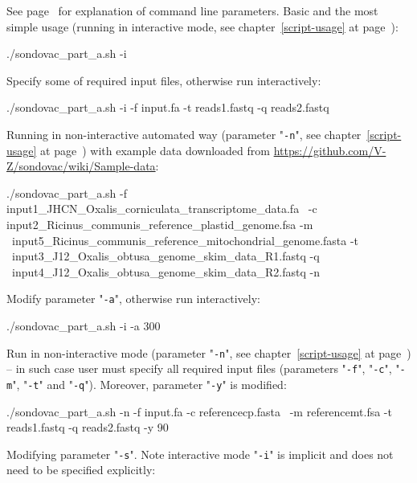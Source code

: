 \documentclass[a4paper, 11pt, twoside]{article}
\begin{document}
See page~\pageref{script-usage} for explanation of command line parameters. Basic and the most simple usage (running in interactive mode, see chapter~\ref{script-usage} at page~\pageref{script-usage}):

\begin{bashcode}
  ./sondovac_part_a.sh -i
\end{bashcode}

Specify some of required input files, otherwise run interactively:

\begin{bashcode}
  ./sondovac_part_a.sh -i -f input.fa -t reads1.fastq -q reads2.fastq
\end{bashcode}

Running in non-interactive automated way (parameter "\texttt{-n}", see chapter~\ref{script-usage} at page~\pageref{script-usage}) with 
example data downloaded from \href{https://github.com/V-Z/sondovac/wiki/Sample-data}{https://github.com/V-Z/sondovac/wiki/Sample-data}:

\begin{bashcode}
  ./sondovac_part_a.sh -f input1_JHCN_Oxalis_corniculata_transcriptome_data.fa \
   -c input2_Ricinus_communis_reference_plastid_genome.fsa -m \
   input5_Ricinus_communis_reference_mitochondrial_genome.fasta -t \
   input3_J12_Oxalis_obtusa_genome_skim_data_R1.fastq -q \
   input4_J12_Oxalis_obtusa_genome_skim_data_R2.fastq -n
\end{bashcode}

Modify parameter "\texttt{-a}", otherwise run interactively:

\begin{bashcode}
  ./sondovac_part_a.sh -i -a 300
\end{bashcode}

Run in non-interactive mode (parameter "\texttt{-n}", see chapter~\ref{script-usage} at page~\pageref{script-usage}) -- in such case user must specify all required input files (parameters "\texttt{-f}", "\texttt{-c}", "\texttt{-m}", "\texttt{-t}" and "\texttt{-q}"). Moreover, parameter "\texttt{-y}" is modified:

\begin{bashcode}
  ./sondovac_part_a.sh -n -f input.fa -c referencecp.fasta \
   -m referencemt.fsa -t reads1.fastq -q reads2.fastq -y 90
\end{bashcode}

Modifying parameter "\texttt{-s}". Note interactive mode "\texttt{-i}" is implicit and does not need to be specified explicitly:
\end{document}
